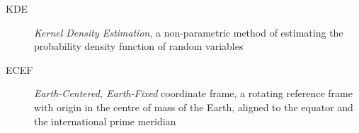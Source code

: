 \begin{description}
    \item[KDE]
        \emph{Kernel Density Estimation}, a non-parametric method of estimating the probability density function of random variables \cite{kde}
    \item[ECEF]
        \emph{Earth-Centered, Earth-Fixed} coordinate frame, a rotating reference frame with origin
        in the centre of mass of the Earth, aligned to the equator and the international prime meridian \cite{ecef}
\end{description}
